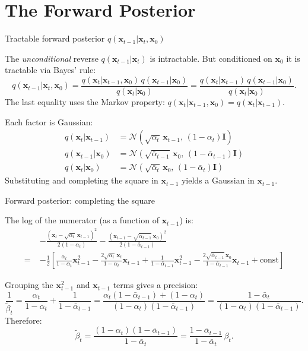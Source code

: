 \documentclass[aspectratio=169,11pt]{beamer}
\newcommand{\Norm}{\mathcal{N}}
\newcommand{\bx}{\bm{x}}
\begin{document}
\section{The Forward Posterior}

\begin{frame}{Tractable forward posterior $q(\bx_{t-1}|\bx_t,\bx_0)$}

The \emph{unconditional} reverse $q(\bx_{t-1}|\bx_t)$ is intractable.
But conditioned on $\bx_0$ it is tractable via Bayes' rule:
\[
  q(\bx_{t-1}|\bx_t,\bx_0)
  = \frac{q(\bx_t|\bx_{t-1},\bx_0)\,q(\bx_{t-1}|\bx_0)}{q(\bx_t|\bx_0)}
  = \frac{q(\bx_t|\bx_{t-1})\,q(\bx_{t-1}|\bx_0)}{q(\bx_t|\bx_0)}.
\]
The last equality uses the Markov property: $q(\bx_t|\bx_{t-1},\bx_0)=q(\bx_t|\bx_{t-1})$.

\medskip
Each factor is Gaussian:
\begin{align*}
q(\bx_t|\bx_{t-1})    &= \Norm(\sqrt{\alpha_t}\,\bx_{t-1},\,(1-\alpha_t)\mathbf{I})\\
q(\bx_{t-1}|\bx_0)   &= \Norm(\sqrt{\bar\alpha_{t-1}}\,\bx_0,\,(1-\bar\alpha_{t-1})\mathbf{I})\\
q(\bx_t|\bx_0)        &= \Norm(\sqrt{\bar\alpha_t}\,\bx_0,\,(1-\bar\alpha_t)\mathbf{I})
\end{align*}
Substituting and completing the square in $\bx_{t-1}$
yields a Gaussian in $\bx_{t-1}$.
\end{frame}

\begin{frame}{Forward posterior: completing the square}

The log of the numerator (as a function of $\bx_{t-1}$) is:
\begin{align*}
&-\frac{(\bx_t - \sqrt{\alpha_t}\,\bx_{t-1})^2}{2(1-\alpha_t)}
 -\frac{(\bx_{t-1} - \sqrt{\bar\alpha_{t-1}}\,\bx_0)^2}{2(1-\bar\alpha_{t-1})}\\[4pt]
=\;&-\frac{1}{2}\left[
  \frac{\alpha_t}{1-\alpha_t}\bx_{t-1}^2
  - \frac{2\sqrt{\alpha_t}\,\bx_t}{1-\alpha_t}\bx_{t-1}
  + \frac{1}{1-\bar\alpha_{t-1}}\bx_{t-1}^2
  - \frac{2\sqrt{\bar\alpha_{t-1}}\,\bx_0}{1-\bar\alpha_{t-1}}\bx_{t-1}
  + \text{const}\right]
\end{align*}

Grouping the $\bx_{t-1}^2$ and $\bx_{t-1}$ terms gives a precision:
\[
  \frac{1}{\tilde\beta_t}
  = \frac{\alpha_t}{1-\alpha_t} + \frac{1}{1-\bar\alpha_{t-1}}
  = \frac{\alpha_t(1-\bar\alpha_{t-1}) + (1-\alpha_t)}{(1-\alpha_t)(1-\bar\alpha_{t-1})}
  = \frac{1-\bar\alpha_t}{(1-\alpha_t)(1-\bar\alpha_{t-1})}.
\]
Therefore:
\[
  \tilde\beta_t
  = \frac{(1-\alpha_t)(1-\bar\alpha_{t-1})}{1-\bar\alpha_t}
  = \frac{1-\bar\alpha_{t-1}}{1-\bar\alpha_t}\,\beta_t.
\]
\end{frame}
\end{document}
